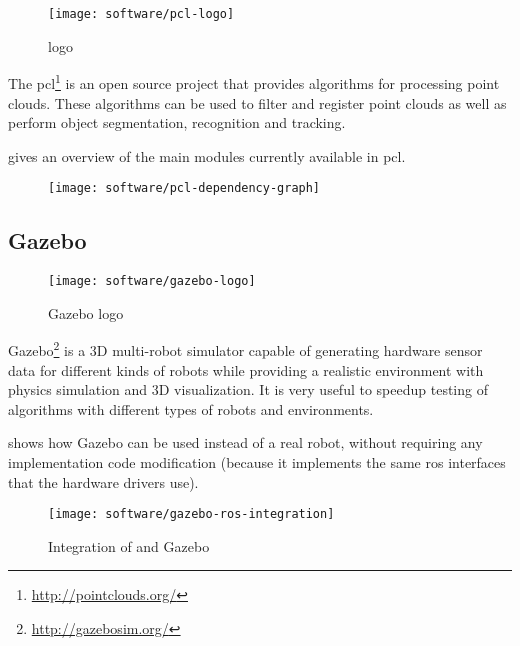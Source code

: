 \begin{wrapfigure}{r}{0.25\textwidth}
	\centering
	\texttt{[image: software/pcl-logo]}
	\caption{ logo}
	\label{pcl-logo}
\end{wrapfigure}

The \gls{pcl}\footnote{\url{http://pointclouds.org/}} \cite{Rusu2011} is an open source project that provides algorithms for processing point clouds. These algorithms can be used to filter and register point clouds as well as perform object segmentation, recognition and tracking.

 gives an overview of the main modules currently available in \gls{pcl}.

\begin{figure}[H]
	\centering
	\texttt{[image: software/pcl-dependency-graph]}
	\caption[]{\protect\footnotemark}
	\label{fig:pcl-dependency-graph}
\end{figure}


\subsection{Gazebo}

\begin{wrapfigure}{r}{0.25\textwidth}
	\centering
	\texttt{[image: software/gazebo-logo]}
	\caption{Gazebo logo}
	\label{fig:gazebo-logo}
\end{wrapfigure}


Gazebo\footnote{\url{http://gazebosim.org/}} is a 3D multi-robot simulator capable of generating hardware sensor data for different kinds of robots while providing a realistic environment with physics simulation and 3D visualization. It is very useful to speedup testing of algorithms with different types of robots and environments.

 shows how Gazebo can be used instead of a real robot, without requiring any implementation code modification (because it implements the same \gls{ros} interfaces that the hardware drivers use).

\begin{figure}[H]
	\centering
	\texttt{[image: software/gazebo-ros-integration]}
	\caption[Integration of  and Gazebo]{Integration of  and Gazebo\protect\footnotemark}
	\label{fig:gazebo-ros-integration}
\end{figure}



